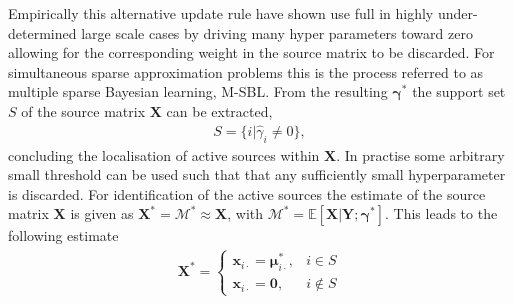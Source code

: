Empirically this alternative update rule have shown use full in highly under-determined large scale cases by driving many hyper parameters toward zero allowing for the corresponding weight in the source matrix to be discarded. 
For simultaneous sparse approximation problems this is the process referred to as multiple sparse Bayesian learning, M-SBL.
From the resulting $\boldsymbol{\gamma}^\ast$ the support set $S$ of the source matrix $\textbf{X}$ can be extracted, 
\begin{align*}
S = \{ i \vert \hat{\gamma}_i \neq 0 \},
\end{align*}
concluding the localisation of active sources within $\textbf{X}$. 
In practise some arbitrary small threshold can be used such that that any sufficiently small hyperparameter is discarded.
For identification of the active sources the estimate of the source matrix $\textbf{X}$ is given as $\textbf{X}^\ast=\mathcal{M}^\ast \approx \textbf{X}$, with $\mathcal{M}^\ast = \mathbb{E}[\textbf{X}\vert \textbf{Y};\boldsymbol{\gamma}^\ast]$. 
This leads to the following estimate  
\begin{align*}
\mathbf{X}^\ast = 
\begin{cases}
\mathbf{x}_{i\cdot} = \boldsymbol{\mu}_{i \cdot}^\ast, & i \in S \\
\mathbf{x}_{i\cdot} = \mathbf{0}, & i \not \in S
\end{cases}
\end{align*}

